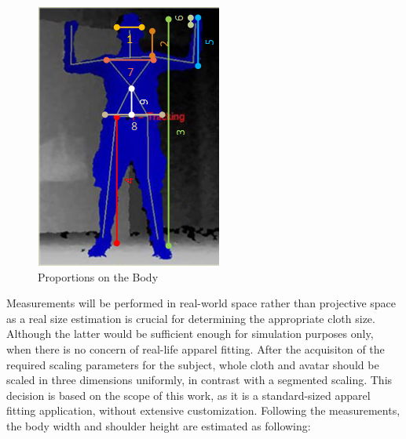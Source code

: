 \documentclass[twocolumn]{svjour3}          %
\begin{document}
\begin{figure}
	\begin{center}
			\includegraphics[width=0.9\columnwidth]{./figures/body_proportions.png}
	\end{center}
	\caption{Proportions on the Body}
	\label{fig:body_proportions}
\end{figure}

Measurements will be performed in real-world space rather than projective space as a real size estimation is crucial for determining the appropriate cloth size. Although the latter would be sufficient enough for simulation purposes only, when there is no concern of real-life apparel fitting. After the acquisiton of the required scaling parameters for the subject, whole cloth and avatar should be scaled in three dimensions uniformly, in contrast with a segmented scaling. This decision is based on the scope of this work, as it is a standard-sized apparel fitting application, without extensive customization. Following the measurements, the body width and shoulder height are estimated as following:
\end{document}
